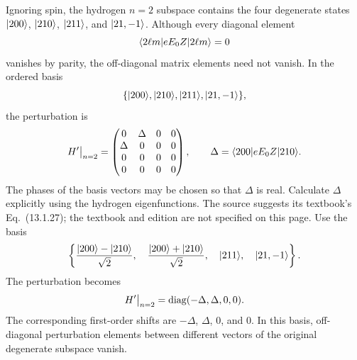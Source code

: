 Ignoring spin, the hydrogen $n=2$ subspace contains the four degenerate
states $\lvert 200\rangle$, $\lvert 210\rangle$, $\lvert 211\rangle$, and $\lvert 21,-1\rangle$.
Although every diagonal element
\[
 \langle 2\ell m\rvert eE_0Z\lvert 2\ell m\rangle=0
\]
vanishes by parity, the off-diagonal matrix elements need not vanish.
In the ordered basis
\[
 \{\lvert 200\rangle,\lvert 210\rangle,\lvert 211\rangle,\lvert 21,-1\rangle\},
\]
the perturbation is
\[
 H'\big|_{n=2}=
 \begin{pmatrix}
 0&\Delta&0&0\\
 \Delta&0&0&0\\
 0&0&0&0\\
 0&0&0&0
 \end{pmatrix},\qquad
 \Delta=\langle 200\rvert eE_0Z\lvert 210\rangle.
\]
The phases of the basis vectors may be chosen so that $\Delta$ is real.
Calculate $\Delta$ explicitly using the hydrogen eigenfunctions. The
source suggests its textbook's Eq.~(13.1.27); the textbook and edition
are not specified on this page.
Use the basis
\[
 \left\{\frac{\lvert 200\rangle-\lvert 210\rangle}{\sqrt2},\quad
        \frac{\lvert 200\rangle+\lvert 210\rangle}{\sqrt2},\quad
        \lvert 211\rangle,\quad\lvert 21,-1\rangle\right\}.
\]
The perturbation becomes
\[
 H'\big|_{n=2}=\operatorname{diag}(-\Delta,\Delta,0,0).
\]
The corresponding first-order shifts are $-\Delta$, $\Delta$, $0$, and
$0$. In this basis, off-diagonal perturbation elements between different
vectors of the original degenerate subspace vanish.
